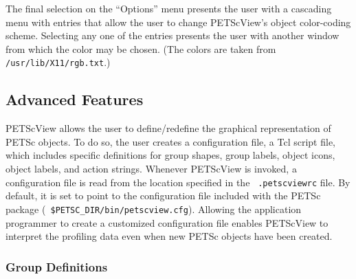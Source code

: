 The final selection on the ``Options'' menu presents the user with a
cascading menu with entries that allow the user to change PETScView's
object color-coding scheme.  Selecting any one of the
entries presents the user with another window from which the color may
be chosen.  (The colors are taken from {\tt /usr/lib/X11/rgb.txt}.)

\subsection{Advanced Features}
\label{sec:petscview_advanced}

PETScView allows the user to define/redefine the graphical
representation of PETSc objects.  To do so, the user creates a
configuration file, a Tcl script file, which includes specific
definitions for group shapes, group labels, object icons, object
labels, and action strings.  Whenever PETScView is invoked, a
configuration file is read from the location specified in the {\tt
.petscviewrc} file.  By default, it is set to point to the
configuration file included with the PETSc package ({\tt
\$PETSC\_DIR/bin/petscview.cfg}).  Allowing the application programmer
to create a customized configuration file enables PETScView to
interpret the profiling data even when new PETSc objects have been
created.

\subsubsection{Group Definitions}

